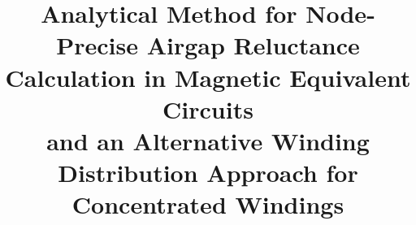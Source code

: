 \title{Analytical Method for Node-Precise Airgap Reluctance Calculation in
Magnetic Equivalent Circuits\\[0.4em]
\large and an Alternative Winding Distribution Approach for Concentrated
Windings}
\author{}
\date{}

\newcommand{\PaperAbstract}{%
This paper introduces two methodologies used for the design of electric
drives. The first method analytically calculates node-accurate cross-sectional
areas to determine rotor-position-dependent air-gap reluctances within the
scope of magnetic equivalent circuits. The second method focuses on
determining winding distribution for concentrated windings. Both approaches
are computationally efficient, requiring minimal code and straightforward
operations, making them well-suited for rapid implementation with low
resource consumption.}

\newif\ifshowbibliography
\showbibliographytrue
